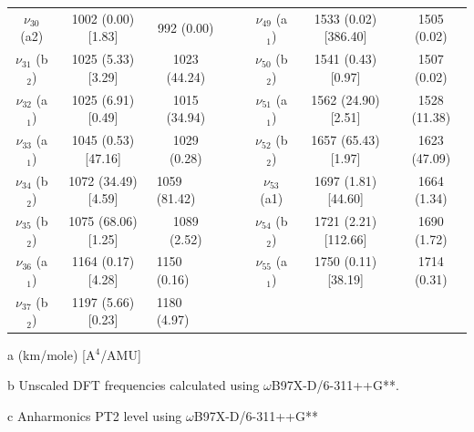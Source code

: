 \begin{table}[H]
\begin{center}
\begin{threeparttable}
{\begin{tabular}{c c c c c c c c}
$\nu_{30}$ (a2) & 1002 (0.00) [1.83] & 992 (0.00) &  &  & $\nu_{49}$ (a$_{1}$) & 1533 (0.02) [386.40] & 1505 (0.02) \\ 
$\nu_{31}$ (b$_{2}$) & 1025 (5.33) [3.29] & 1023 (44.24) &  &  & $\nu_{50}$ (b$_{2}$) &    1541 (0.43) [0.97] & 1507 (0.02) \\ 
$\nu_{32}$ (a$_{1}$)& 1025 (6.91) [0.49] & 1015 (34.94) &  &  & $\nu_{51}$ (a$_{1}$) & 1562 (24.90) [2.51] & 1528 (11.38) \\ 
$\nu_{33}$ (a$_{1}$) & 1045 (0.53) [47.16] & 1029 (0.28) &  &  & $\nu_{52}$ (b$_{2}$) & 1657 (65.43) [1.97] & 1623 (47.09) \\ 
$\nu_{34}$ (b$_{2}$) & 1072 (34.49) [4.59] & \multicolumn{1}{l}{1059 (81.42)} &  &  & $\nu_{53}$ (a1) & 1697 (1.81) [44.60] & 1664 (1.34) \\ 
$\nu_{35}$ (b$_{2}$)  & 1075 (68.06) [1.25] & 1089 (2.52) &  &  &   $\nu_{54}$ (b$_{2}$) & 1721 (2.21) [112.66] & 1690 (1.72) \\ 
$\nu_{36}$ (a$_{1}$) & 1164 (0.17) [4.28] & \multicolumn{1}{l}{1150 (0.16)} &  &  &   $\nu_{55}$ (a$_{1}$) & 1750 (0.11) [38.19] & 1714 (0.31) \\ 
$\nu_{37}$ (b$_{2}$) & 1197 (5.66) [0.23] & \multicolumn{1}{l}{1180 (4.97)} &  &  & \multicolumn{1}{l}{} &  &  \\ 
	\bottomrule
\end{tabular}}

\begin{tablenotes}
	\item[a] (km/mole) [A$^{4}$/AMU]
	\item[b] Unscaled DFT frequencies calculated using $\omega$B97X-D/6-311++G**.
	\item[c] Anharmonics PT2 level using $\omega$B97X-D/6-311++G** 
\end{tablenotes}
\end{threeparttable}
\end{center}
\label{freq-Tribenzofuran}
\end{table}





